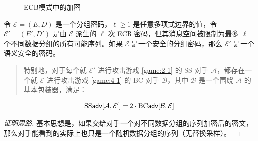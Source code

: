 \begin{figure}
  \centering
  \quad\quad\quad\quad\quad
  \caption{ECB模式中的加密}
  \label{fig:4-5}
\end{figure}

\begin{theorem}\label{theo:4-1}
令 $\mathcal{E}=(E,D)$ 是一个分组密码，$\ell\geq1$ 是任意多项式边界的值，令 $\mathcal{E}'=(E',D')$ 是由 $\mathcal{E}$ 派生的 $\ell$ 次 ECB 密码，但其消息空间被限制为最多 $\ell$ 个不同数据分组的所有可能序列。如果 $\mathcal{E}$ 是一个安全的分组密码，那么 $\mathcal{E}'$ 是一个语义安全的密码。
\begin{quote}
特别地，对于每个就 $\mathcal{E}'$ 进行攻击游戏 \ref{game:2-1} 的 SS 对手 $\mathcal{A}$，都存在一个就 $\mathcal{E}$ 进行攻击游戏 \ref{game:4-1} 的 BC 对手 $\mathcal{B}$，其中 $\mathcal{B}$ 是一个围绕 $\mathcal{A}$ 的基本包装器，满足：
\end{quote}
\begin{equation}\label{eq:4-3}
{\rm SS\mathsf{adv}}[\mathcal{A},\mathcal{E}']=2\cdot{\rm BC\mathsf{adv}}[\mathcal{B},\mathcal{E}]
\end{equation}
\end{theorem}

\begin{proof}[证明思路]
基本思想是，如果交给对手一个对不同数据分组的序列加密后的密文，那么对手能看到的实际上也只是一个随机数据分组的序列（无替换采样）。
\end{proof}

